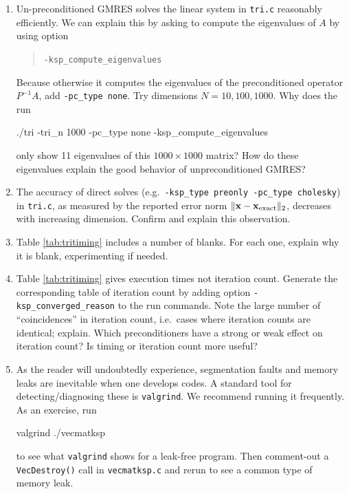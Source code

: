\begin{enumerate}
\item \label{exer:computeeigs} Un-preconditioned GMRES solves the linear system in \texttt{tri.c} reasonably efficiently.  We can explain this by asking \PETSc to compute the eigenvalues of $A$ by using option
\begin{quote}
\texttt{-ksp\_compute\_eigenvalues}
\end{quote}
Because otherwise it computes the eigenvalues of the preconditioned operator $P^{-1}A$, add \texttt{-pc\_type none}.  Try dimensions $N=10,100,1000$.  Why does the  run
\begin{cline}
./tri -tri_n 1000 -pc_type none -ksp_compute_eigenvalues
\end{cline}
only show 11 eigenvalues of this $1000\times 1000$ matrix?  How do these eigenvalues explain the good behavior of unpreconditioned GMRES?

\item The accuracy of direct solves (e.g.~\texttt{-ksp\_type preonly -pc\_type cholesky}) in \texttt{tri.c}, as measured by the reported error norm $\|\mathbf{x} - \mathbf{x}_{\text{exact}}\|_2$, decreases with increasing dimension.  Confirm and explain this observation.

\item Table \ref{tab:tritiming} includes a number of blanks.  For each one, explain why it is blank, experimenting if needed.

\item Table \ref{tab:tritiming} gives execution times not iteration count.  Generate the corresponding table of \pKSP iteration count by adding option \verb|-ksp_converged_reason| to the run commands.  Note the large number of ``coincidences'' in iteration count, i.e.~cases where iteration counts are identical; explain.  Which preconditioners have a strong or weak effect on iteration count?  Is timing or iteration count more useful?

\item As the reader will undoubtedly experience, segmentation faults and memory leaks are inevitable when one develops \PETSc codes.  A standard tool for detecting/diagnosing these is \texttt{valgrind}.  We recommend running it frequently.  As an exercise, run
\begin{cline}
valgrind ./vecmatksp
\end{cline}
to see what \texttt{valgrind} shows for a leak-free program.  Then comment-out a \texttt{VecDestroy()} call in \texttt{vecmatksp.c} and rerun to see a common type of memory leak.


\end{enumerate}
